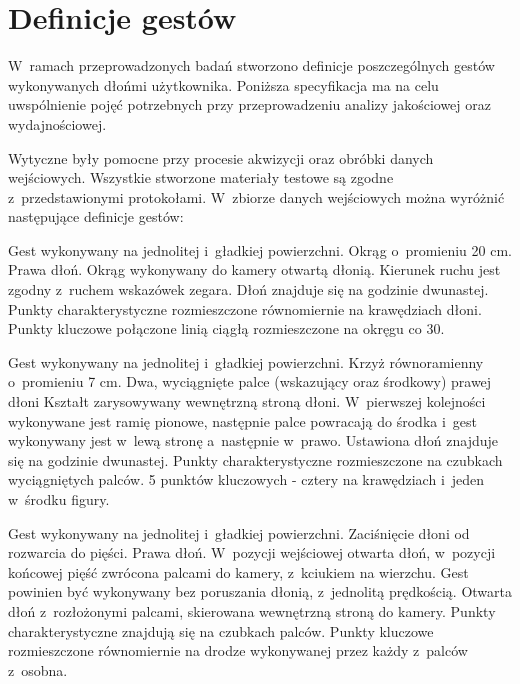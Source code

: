   \section{Definicje gestów}\label{Section_DefinicjeGestow}

    W~ramach przeprowadzonych badań stworzono definicje poszczególnych gestów wykonywanych dłońmi użytkownika. Poniższa specyfikacja ma na celu uwspólnienie pojęć potrzebnych przy przeprowadzeniu analizy jakościowej oraz wydajnościowej.

    Wytyczne były pomocne przy procesie akwizycji oraz obróbki danych wejściowych. Wszystkie stworzone materiały testowe są zgodne z~przedstawionymi protokołami. W~zbiorze danych wejściowych można wyróżnić następujące definicje gestów:

         {Gest wykonywany na jednolitej i~gładkiej powierzchni.}
         {Okrąg o~promieniu 20 cm.}
         {Prawa dłoń.}
         {Okrąg wykonywany do kamery otwartą dłonią.}
         {Kierunek ruchu jest zgodny z~ruchem wskazówek zegara.}
         {Dłoń znajduje się na godzinie dwunastej.}
         {Punkty charakterystyczne rozmieszczone równomiernie na krawędziach dłoni.}
         {Punkty kluczowe połączone linią ciągłą rozmieszczone na okręgu co 30\degree.}

    \newpage
         {Gest wykonywany na jednolitej i~gładkiej powierzchni.}
         {Krzyż równoramienny o~promieniu 7 cm.}
         {Dwa, wyciągnięte palce (wskazujący oraz środkowy) prawej dłoni}
         {Kształt zarysowywany wewnętrzną stroną dłoni.}
         {W~pierwszej kolejności wykonywane jest ramię pionowe, następnie palce powracają do środka i~gest wykonywany jest w~lewą stronę a~następnie w~prawo.}
         {Ustawiona dłoń znajduje się na godzinie dwunastej.}
         {Punkty charakterystyczne rozmieszczone na czubkach wyciągniętych palców.}
         {5 punktów kluczowych - cztery na krawędziach i~jeden w~środku figury.}

         {Gest wykonywany na jednolitej i~gładkiej powierzchni.}
         {Zaciśnięcie dłoni od rozwarcia do pięści.}
         {Prawa dłoń.}
         {W~pozycji wejściowej otwarta dłoń, w~pozycji końcowej pięść zwrócona palcami do kamery, z~kciukiem na wierzchu.}
         {Gest powinien być wykonywany bez poruszania dłonią, z~jednolitą prędkością.}
         {Otwarta dłoń z~rozłożonymi palcami, skierowana wewnętrzną stroną do kamery.}
         {Punkty charakterystyczne znajdują się na czubkach palców.}
         {Punkty kluczowe rozmieszczone równomiernie na drodze wykonywanej przez każdy z~palców z~osobna.}

